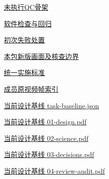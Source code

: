 \documentclass[11pt,a4paper]{article}
\begin{document}
\href{file:///D:/Agent/srp/agent/tasks/B-01/outputs/batch-qc-template.json}{未执行QC骨架}


\href{file:///D:/Agent/srp/agent/tasks/B-01/evidence/verification.json}{软件检查与回归}


\href{file:///D:/Agent/srp/agent/tasks/B-01/evidence/failure-disposition.md}{初次失败处置}


\href{file:///D:/Agent/srp/agent/tasks/B-01/outputs/current-implementation-evidence.md}{本包新版画面及核查边界}


\href{file:///D:/Agent/srp/agent/design/weather/2026-10-08_Storm\%E4\%B8\%8E\%E7\%BA\%AF\%E7\%B2\%92\%E5\%AD\%90\%E5\%8F\%8C\%E7\%8E\%AF\%E5\%AE\%9E\%E6\%96\%BD\%E6\%A0\%87\%E5\%87\%86.md}{统一实施标准}


\href{file:///D:/Agent/srp/human/assets/previews/2026-10-08/member-storm-particle-rings/frame-index.json}{成员原视频帧索引}


\href{file:///D:/Agent/srp/agent/design/design-foundation-20261008/task-baseline.json}{当前设计基线 task-\allowbreak{}baseline.json}


\href{file:///D:/Agent/srp/agent/design/design-foundation-20261008/01-design.pdf}{当前设计基线 01-\allowbreak{}design.pdf}


\href{file:///D:/Agent/srp/agent/design/design-foundation-20261008/02-science.pdf}{当前设计基线 02-\allowbreak{}science.pdf}


\href{file:///D:/Agent/srp/agent/design/design-foundation-20261008/03-decisions.pdf}{当前设计基线 03-\allowbreak{}decisions.pdf}


\href{file:///D:/Agent/srp/agent/design/design-foundation-20261008/04-review-audit.pdf}{当前设计基线 04-\allowbreak{}review-\allowbreak{}audit.pdf}
\end{document}
